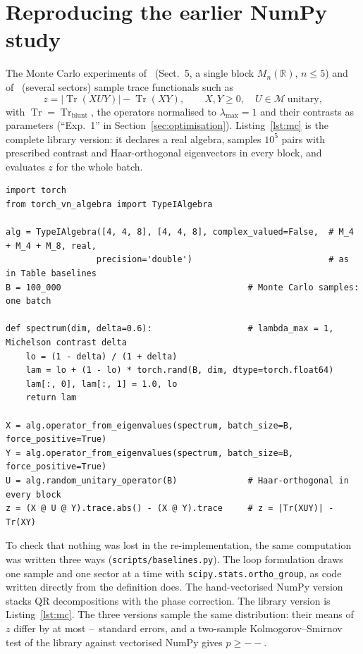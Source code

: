 \documentclass[11pt]{article}
\DeclareMathOperator{\Tr}{Tr}
\newcommand{\M}{\mathcal{M}}
\providecommand{\BaseMinKS}{--}\providecommand{\BoundsStChecked}{--}\providecommand{\BoundsStOutside}{--}\providecommand{\BoundsShortfall}{--}
\providecommand{\BaseMaxSigma}{--}
\begin{document}
\section{Reproducing the earlier NumPy study}\label{sec:reproduce}

The Monte Carlo experiments of~\cite{abed2024} (Sect.~5, a single block $M_n(\mathbb R)$, $n\le5$) and of~\cite{v1}
(several sectors) sample trace functionals such as
\begin{equation}\label{eq:exp1}
  z=|\Tr(XUY)|-\Tr(XY),\qquad X,Y\ge0,\quad U\in\M\ \text{unitary},
\end{equation}
with $\Tr=\Tr_{\mathrm{blunt}}$, the operators normalised to $\lambda_{\max}=1$ and their contrasts as parameters
(``Exp.~1'' in Section~\ref{sec:optimisation}). Listing~\ref{lst:mc} is the complete library version: it declares a real
algebra, samples $10^5$ pairs with prescribed contrast and Haar-orthogonal eigenvectors in every block, and evaluates
$z$ for the whole batch.

\begin{lstlisting}[float=t, caption={The Monte Carlo of~\eqref{eq:exp1} in $M_4\oplus M_4\oplus M_8$ over $\mathbb R$:
$10^5$ samples in one batch. \texttt{operator\_from\_eigenvalues} draws independent Haar eigenvectors in every block,
\texttt{trace} is $\Tr_{\mathrm{blunt}}$.}, label=lst:mc]
import torch
from torch_vn_algebra import TypeIAlgebra

alg = TypeIAlgebra([4, 4, 8], [4, 4, 8], complex_valued=False,  # M_4 + M_4 + M_8, real,
                  precision='double')                           # as in Table baselines
B = 100_000                                     # Monte Carlo samples: one batch

def spectrum(dim, delta=0.6):                   # lambda_max = 1, Michelson contrast delta
    lo = (1 - delta) / (1 + delta)
    lam = lo + (1 - lo) * torch.rand(B, dim, dtype=torch.float64)
    lam[:, 0], lam[:, 1] = 1.0, lo
    return lam

X = alg.operator_from_eigenvalues(spectrum, batch_size=B, force_positive=True)
Y = alg.operator_from_eigenvalues(spectrum, batch_size=B, force_positive=True)
U = alg.random_unitary_operator(B)              # Haar-orthogonal in every block
z = (X @ U @ Y).trace.abs() - (X @ Y).trace     # z = |Tr(XUY)| - Tr(XY)
\end{lstlisting}

To check that nothing was lost in the re-implementation, the same computation was written three ways
(\texttt{scripts/baselines.py}). The loop formulation draws one sample and one sector at a time with
\texttt{scipy.stats.ortho\_group}, as code written directly from the definition does. The hand-vectorised NumPy version
stacks QR decompositions with the phase correction. The library version is Listing~\ref{lst:mc}. The three versions
sample the same distribution: their means of $z$ differ by at most \BaseMaxSigma\ standard
errors\ifnum{}, and a two-sample Kolmogorov--Smirnov test of the library against vectorised NumPy gives
$p\ge\BaseMinKS$\fi.
\end{document}
